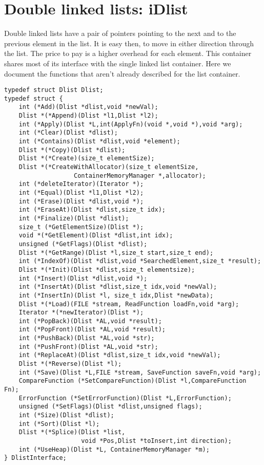 \documentclass[12pt,a4paper]{memoir} %
\begin{document}
{\section{Double linked lists: iDlist}
Double linked lists have a pair of pointers pointing to the next and to the previous element in the list. It is easy then, to move in  either direction through the list. The price to pay is a higher overhead for each element.
This container shares most of its interface with the single linked list container.  Here we document the functions that aren't already described for the list container.
\begin{verbatim}
typedef struct Dlist Dlist;
typedef struct {
    int (*Add)(Dlist *dlist,void *newVal);              
    Dlist *(*Append)(Dlist *l1,Dlist *l2);
    int (*Apply)(Dlist *L,int(ApplyFn)(void *,void *),void *arg);
    int (*Clear)(Dlist *dlist);                 
    int (*Contains)(Dlist *dlist,void *element);                
    Dlist *(*Copy)(Dlist *dlist);                  
    Dlist *(*Create)(size_t elementSize);
    Dlist *(*CreateWithAllocator)(size_t elementSize,
                   ContainerMemoryManager *,allocator);
    int (*deleteIterator)(Iterator *);
    int (*Equal)(Dlist *l1,Dlist *l2);
    int (*Erase)(Dlist *dlist,void *);                
    int (*EraseAt)(Dlist *dlist,size_t idx);              
    int (*Finalize)(Dlist *dlist);                                 
    size_t (*GetElementSize)(Dlist *);
    void *(*GetElement)(Dlist *dlist,int idx);             
    unsigned (*GetFlags)(Dlist *dlist);                               
    Dlist *(*GetRange)(Dlist *l,size_t start,size_t end);
    int (*IndexOf)(Dlist *dlist,void *SearchedElement,size_t *result);
    Dlist *(*Init)(Dlist *dlist,size_t elementsize);     
    int (*Insert)(Dlist *dlist,void *);
    int (*InsertAt)(Dlist *dlist,size_t idx,void *newVal);
    int (*InsertIn)(Dlist *l, size_t idx,Dlist *newData); 
    Dlist *(*Load)(FILE *stream, ReadFunction loadFn,void *arg);
    Iterator *(*newIterator)(Dlist *);
    int (*PopBack)(Dlist *AL,void *result);
    int (*PopFront)(Dlist *AL,void *result);
    int (*PushBack)(Dlist *AL,void *str);
    int (*PushFront)(Dlist *AL,void *str);
    int (*ReplaceAt)(Dlist *dlist,size_t idx,void *newVal); 
    Dlist *(*Reverse)(Dlist *l);                                
    int (*Save)(Dlist *L,FILE *stream, SaveFunction saveFn,void *arg);
    CompareFunction (*SetCompareFunction)(Dlist *l,CompareFunction Fn);
    ErrorFunction (*SetErrorFunction)(Dlist *L,ErrorFunction);
    unsigned (*SetFlags)(Dlist *dlist,unsigned flags);                    
    int (*Size)(Dlist *dlist);                 
    int (*Sort)(Dlist *l);                                        
    Dlist *(*Splice)(Dlist *list,
                     void *Pos,Dlist *toInsert,int direction);
    int (*UseHeap)(Dlist *L, ContainerMemoryManager *m);
} DlistInterface;


\end{verbatim}}
\end{document}

